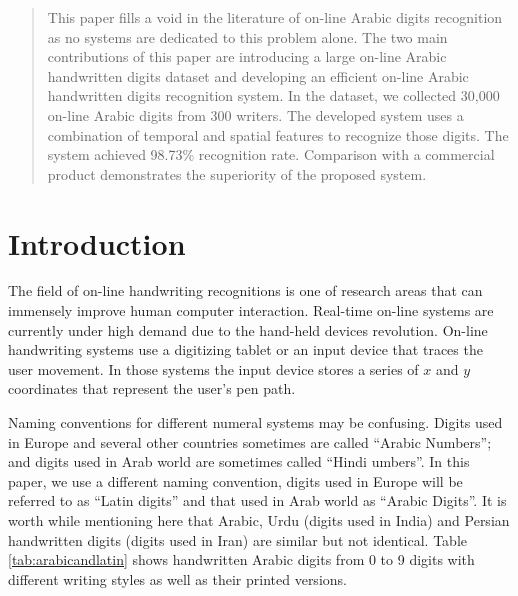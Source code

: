 \documentclass[times, 10pt,twocolumn]{article}
\begin{document}
\begin{abstract}



This paper fills a void in the literature of on-line Arabic digits recognition as no systems are dedicated to this problem alone. The two main contributions of this paper are introducing a large on-line Arabic handwritten digits dataset and developing an efficient on-line Arabic handwritten digits recognition system. In the dataset, we collected 30,000 on-line Arabic digits from 300 writers. The developed system uses a combination of temporal and spatial features to recognize those digits. The system achieved 98.73\% recognition rate. Comparison with a commercial product demonstrates the superiority of the proposed system.





\end{abstract}

%



\section{Introduction}
\label{sec:Introduction}
 The field of on-line handwriting recognitions is one of research areas that can immensely improve human computer interaction.  Real-time on-line systems are currently under high demand due to the hand-held devices revolution. On-line handwriting systems use a digitizing tablet or an input device that traces the user movement. In those systems the input device stores a series of $x$ and $y$ coordinates that represent the user's pen path.


Naming conventions for different numeral systems may be confusing. Digits used in Europe and several other countries sometimes are called “Arabic Numbers”; and digits used in Arab world are sometimes called “Hindi umbers”. In this paper, we use a different naming convention, digits used in Europe will be referred to as “Latin digits” and that used in Arab world as “Arabic Digits”. It is worth while mentioning here that Arabic, Urdu (digits used in India) and Persian handwritten digits (digits used in Iran) are similar but not identical.  Table \ref{tab:arabicandlatin} shows handwritten Arabic digits from 0 to 9 digits with different writing styles as well as their printed versions.
\end{document}
